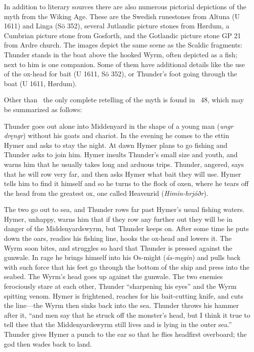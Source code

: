 In addition to literary sources there are also numerous pictorial depictions of the myth from the Wiking Age.  These are the Swedish runestones from Altuna (U 1611) and Linga (Sö 352), several Jutlandic picture stones from Hørdum, a Cumbrian picture stone from Gosforth, and the Gotlandic picture stone GP 21 from Ardre church.  The images depict the same scene as the Scaldic fragments: Thunder stands in the boat above the hooked Wyrm, often depicted as a fish; next to him is one companion.  Some of them have additional details like the use of the ox-head for bait (U 1611, Sö 352), or Thunder’s foot going through the boat (U 1611, Hørdum).

Other than \Hymiskvida\ the only complete retelling of the myth is found in \Gylfaginning\ 48, which may be summarized as follows:

{\small Thunder goes out alone into Middenyard in the shape of a young man (\emph{ungr dręngr}) without his goats and chariot.  In the evening he comes to the ettin Hymer and asks to stay the night.  At dawn Hymer plans to go fishing and Thunder asks to join him.  Hymer insults Thunder's small size and youth, and warns him that he usually takes long and arduous trips.  Thunder, angered, says that he will row very far, and then asks Hymer what bait they will use.  Hymer tells him to find it himself and so he turns to the flock of oxen, where he tears off the head from the greatest ox, one called Heavenrid (\emph{Himin-hrjóðr}).

The two go out to sea, and Thunder rows far past Hymer’s usual fishing waters.  Hymer, unhappy, warns him that if they row any further out they will be in danger of the Middenyardswyrm, but Thunder keeps on.  After some time he puts down the oars, readies his fishing line, hooks the ox-head and lowers it.  The Wyrm soon bites, and struggles so hard that Thunder is pressed against the gunwale.  In rage he brings himself into his Os-might (\emph{ás-męgin}) and pulls back with such force that his feet go through the bottom of the ship and press into the seabed.  The Wyrm's head goes up against the gunwale.  The two enemies ferociously stare at each other, Thunder “sharpening his eyes” and the Wyrm spitting venom.  Hymer is frightened, reaches for his bait-cutting knife, and cuts the line—the Wyrm then sinks back into the sea.  Thunder throws his hammer after it, “and men say that he struck off the monster’s head, but I think it true to tell thee that the Middenyardswyrm still lives and is lying in the outer sea.”  Thunder gives Hymer a punch to the ear so that he flies headfirst overboard; the god then wades back to land.}

